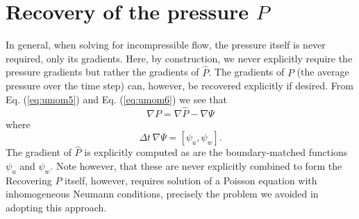 \documentclass{jfm-like}
\begin{document}
\section{Recovery of the pressure $P$}
In general, when solving for incompressible flow, the pressure itself is never required, only its gradients. Here, by construction, we never explicitly require the pressure gradients but rather
the gradients of ${\hat P}$. The gradients of $P$ (the average pressure over the time step) can, however, be recovered explicitly if desired. From Eq. (\ref{eq:umom5}) and Eq. (\ref{eq:umom6})
we see that
\begin{equation}
\nabla P = \nabla {\hat P} - \nabla \Psi
\end{equation}
where
\begin{equation}
\Delta t \, \nabla \Psi = [ \psi_u,\psi_w].
\end{equation}
The gradient of ${\hat P}$ is explicitly computed as are the boundary-matched functions $\psi_u$ and $\psi_w$. Note however, that these are never explicitly combined to form the Recovering $P$ itself, however, requires solution of a Poisson equation with inhomogeneous Neumann
conditions, precisely the problem we avoided in adopting this approach.
\end{document}

